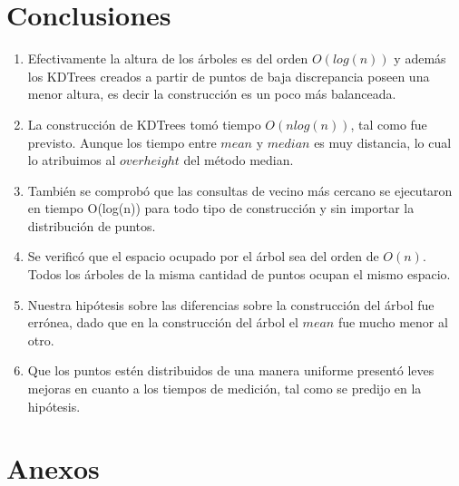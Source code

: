 \documentclass[12pt,letterpaper, margin = 3cm]{article}
\begin{document}
\section{Conclusiones}
\begin{enumerate} 
\item Efectivamente la altura de los árboles es del orden $O(log(n))$ y además los KDTrees creados a partir de puntos de baja discrepancia poseen una menor altura, es decir la construcción es un poco más balanceada.
\item La construcción de KDTrees tomó tiempo $O(n log(n))$, tal como fue previsto. Aunque los tiempo entre $mean$ y $median$ es muy distancia, lo cual lo atribuimos al $overheight$ del método median.
\item También se comprobó que las consultas de vecino más cercano se ejecutaron en tiempo O(log(n)) para todo tipo de construcción y sin importar la distribución de puntos.
\item Se verificó que el espacio ocupado por el árbol sea del orden de $O(n)$. Todos los árboles de la misma cantidad de puntos ocupan el mismo espacio.
\item Nuestra hipótesis sobre las diferencias sobre la construcción del árbol fue errónea, dado que en la construcción del árbol el $mean$ fue mucho menor al otro.
\item Que los puntos estén distribuidos de una manera uniforme presentó leves mejoras en cuanto a los tiempos de medición, tal como se predijo en la hipótesis.
\end{enumerate}




\newpage
\section{Anexos}




\end{document}
